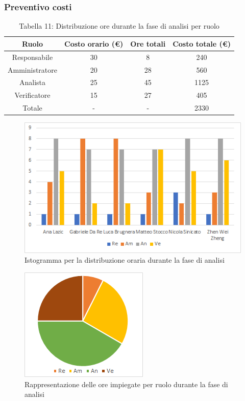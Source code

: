 \vspace{100pt}
\subsubsection{Preventivo costi}
\begin{table}[h]
	\setlength\extrarowheight{5pt}
	\centering
	\begin{tabularx}{\textwidth}{|c|c|c|c|}
		\hline
		\textbf{Ruolo} & \textbf{Costo orario (€)} & \textbf{Ore totali} & \textbf{Costo totale (€)} \\
		\hline
		Responsabile &30&8&240 \\
		\hline
		Amministratore &20&28&560 \\
		\hline
		Analista &25&45&1125 \\
		\hline
		Verificatore &15&27&405 \\
		\hline
		Totale &-&-&2330 \\
		\hline
	\end{tabularx}
    \vspace{10pt}
	\caption{Tabella 11: Distribuzione ore durante la fase di analisi per ruolo}
\end{table}
\begin{figure}[H]
    \centering
    \includegraphics[scale=0.6]{img/grafi preventivo/istogrammi/analisi.png}
    \caption{Istogramma per la distribuzione oraria durante la fase di analisi}
\end{figure}
\begin{figure}[H]
    \centering
    \includegraphics[scale=0.6]{img/grafi preventivo/torta/analisi.PNG}
    \caption{Rappresentazione delle ore impiegate per ruolo durante la fase di analisi}
\end{figure}



